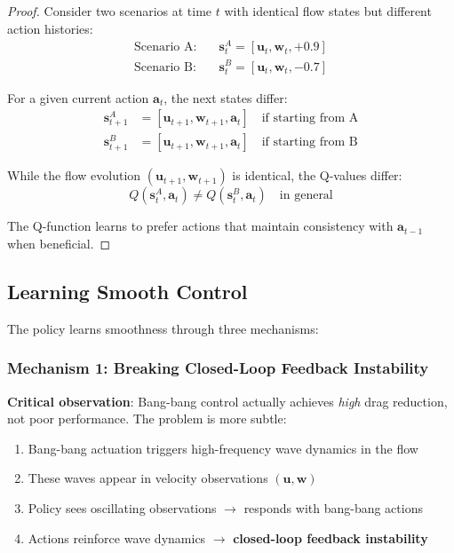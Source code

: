 \documentclass[11pt,a4paper]{article}
\theoremstyle{definition}
\begin{document}
\begin{proof}
Consider two scenarios at time $t$ with identical flow states but different action histories:
\begin{align}
    \text{Scenario A:} \quad &\mathbf{s}_t^A = [\mathbf{u}_t, \mathbf{w}_t, +0.9] \\
    \text{Scenario B:} \quad &\mathbf{s}_t^B = [\mathbf{u}_t, \mathbf{w}_t, -0.7]
\end{align}

For a given current action $\mathbf{a}_t$, the next states differ:
\begin{align}
    \mathbf{s}_{t+1}^A &= [\mathbf{u}_{t+1}, \mathbf{w}_{t+1}, \mathbf{a}_t] \quad \text{if starting from A} \\
    \mathbf{s}_{t+1}^B &= [\mathbf{u}_{t+1}, \mathbf{w}_{t+1}, \mathbf{a}_t] \quad \text{if starting from B}
\end{align}

While the flow evolution $(\mathbf{u}_{t+1}, \mathbf{w}_{t+1})$ is identical, the Q-values differ:
\begin{equation}
    Q(\mathbf{s}_t^A, \mathbf{a}_t) \neq Q(\mathbf{s}_t^B, \mathbf{a}_t) \quad \text{in general}
\end{equation}

The Q-function learns to prefer actions that maintain consistency with $\mathbf{a}_{t-1}$ when beneficial.
\end{proof}

\subsection{Learning Smooth Control}

The policy learns smoothness through three mechanisms:

\subsubsection{Mechanism 1: Breaking Closed-Loop Feedback Instability}

\textbf{Critical observation}: Bang-bang control actually achieves \emph{high} drag reduction, not poor performance. The problem is more subtle:

\begin{enumerate}
    \item Bang-bang actuation triggers high-frequency wave dynamics in the flow
    \item These waves appear in velocity observations $(\mathbf{u}, \mathbf{w})$
    \item Policy sees oscillating observations $\to$ responds with bang-bang actions
    \item Actions reinforce wave dynamics $\to$ \textbf{closed-loop feedback instability}
\end{enumerate}
\end{document}
